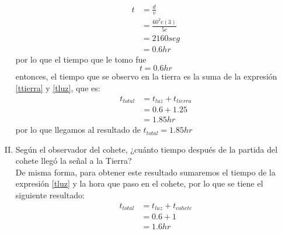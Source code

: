 \documentclass[12pt,letterpaper]{report}
\begin{document}
\begin{enumerate}[I)]
    \begin{align*}
        t   &= \frac{d}{v}\\
            &=\frac{60^2 c(3)}{5c}\\
            &=2160 seg\\
            & = 0.6 hr
    \end{align*}
    por lo que el tiempo que le tomo fue 
    \begin{equation}
        \label{tluz}
        t= 0.6 hr
    \end{equation}
    entonces, el tiempo que se observo en la tierra es la suma de la expresión \ref{ttierra} y \ref{tluz}, que es:
    \begin{align*}
        t_{total}   &=t_{luz}+t_{tierra}\\
                    &=0.6+1.25\\
                    &=1.85 hr
    \end{align*}
    por lo que llegamos al resultado de $t_{total}=1.85 hr$
    \item Según el observador del cohete, ¿cuánto tiempo después de la partida del cohete llegó la señal a la Tierra?\\
    De misma forma, para obtener este resultado sumaremos el tiempo de la expresión \ref{tluz} y la hora que paso en el cohete, por lo que se tiene el siguiente resultado:
    \begin{align*}
        t_{total}   &=t_{luz}+t_{cohete}\\
                    &=0.6+1\\
                    &=1.6 hr
    \end{align*}
\end{enumerate}
\end{document}
